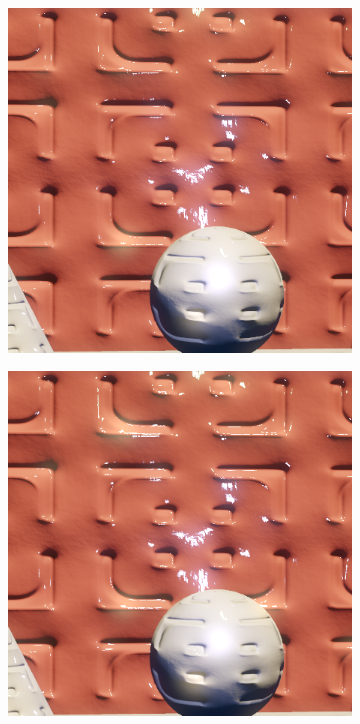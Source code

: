 \begin{figure}
\begin{fullwidth}
	\begin{subfigure}[b]{0.32\thewidth}
		\includegraphics[width=1.\textwidth]{figures/intro/specaliasing_none}
	\end{subfigure}
	\begin{subfigure}[b]{0.32\thewidth}
		\includegraphics[width=1.\textwidth]{figures/intro/specaliasing_4xss}

\end{subfigure}
\end{fullwidth}
\end{figure}
